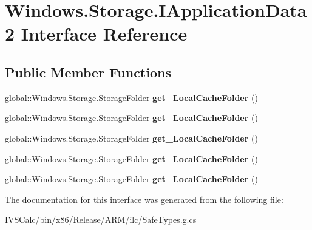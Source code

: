 \hypertarget{interface_windows_1_1_storage_1_1_i_application_data2}{}\section{Windows.\+Storage.\+I\+Application\+Data2 Interface Reference}
\label{interface_windows_1_1_storage_1_1_i_application_data2}
\subsection*{Public Member Functions}
\begin{DoxyCompactItemize}
\item 
\mbox{\label{interface_windows_1_1_storage_1_1_i_application_data2_a79396275d7cfd6e970ca36afebd018d0}} 
global\+::\+Windows.\+Storage.\+Storage\+Folder {\bfseries get\+\_\+\+Local\+Cache\+Folder} ()
\item 
\mbox{\label{interface_windows_1_1_storage_1_1_i_application_data2_a79396275d7cfd6e970ca36afebd018d0}} 
global\+::\+Windows.\+Storage.\+Storage\+Folder {\bfseries get\+\_\+\+Local\+Cache\+Folder} ()
\item 
\mbox{\label{interface_windows_1_1_storage_1_1_i_application_data2_a79396275d7cfd6e970ca36afebd018d0}} 
global\+::\+Windows.\+Storage.\+Storage\+Folder {\bfseries get\+\_\+\+Local\+Cache\+Folder} ()
\item 
\mbox{\label{interface_windows_1_1_storage_1_1_i_application_data2_a79396275d7cfd6e970ca36afebd018d0}} 
global\+::\+Windows.\+Storage.\+Storage\+Folder {\bfseries get\+\_\+\+Local\+Cache\+Folder} ()
\item 
\mbox{\label{interface_windows_1_1_storage_1_1_i_application_data2_a79396275d7cfd6e970ca36afebd018d0}} 
global\+::\+Windows.\+Storage.\+Storage\+Folder {\bfseries get\+\_\+\+Local\+Cache\+Folder} ()
\end{DoxyCompactItemize}


The documentation for this interface was generated from the following file\+:\begin{DoxyCompactItemize}
\item 
I\+V\+S\+Calc/bin/x86/\+Release/\+A\+R\+M/ilc/Safe\+Types.\+g.\+cs\end{DoxyCompactItemize}

